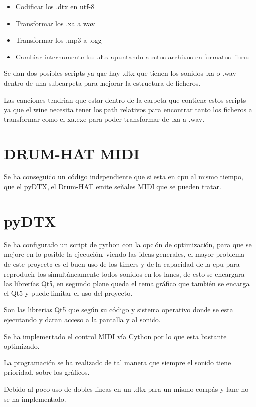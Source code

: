 \documentclass[a4paper,11pt,oneside]{book}
\begin{document}
\begin{itemize}
   \item Codificar los .dtx en utf-8
   \item Transformar los .xa a wav
   \item Transformar los .mp3 a .ogg
   \item Cambiar internamente los .dtx apuntando a estos archivos en formatos libres
 \end{itemize}

Se dan dos posibles scripts ya que hay .dtx que tienen los sonidos .xa o .wav dentro de una subcarpeta para mejorar la estructura de ficheros.

Las canciones tendrian que estar dentro de la carpeta que contiene estos scripts ya que el wine necesita tener los path relativos para encontrar tanto los ficheros a transformar como el xa.exe para poder transformar de .xa a .wav.

\section{DRUM-HAT MIDI}

Se ha conseguido un código independiente que si esta en cpu al mismo tiempo, que el pyDTX, el Drum-HAT emite señales MIDI que se pueden tratar.

\section{pyDTX}

Se ha configurado un script de python con la opción de optimización, para que se mejore en lo posible la ejecución, viendo las ideas generales, el mayor problema de este proyecto es el buen uso de los timers y de la capacidad de la cpu para reproducir los simultáneamente todos sonidos en los lanes, de esto se encargara las librerías Qt5, en segundo plane queda el tema gráfico que también se encarga el Qt5 y puede limitar el uso del proyecto.

Son las librerias Qt5 que según su código y sistema operativo donde se esta ejecutando y daran acceso a la pantalla y al sonido. 

Se ha implementado el control MIDI vía Cython por lo que esta bastante optimizado.

La programación se ha realizado de tal manera que siempre el sonido tiene prioridad, sobre los gráficos.

Debido al poco uso de dobles lineas en un .dtx para un mismo compás y lane no se ha implementado.
\end{document}
